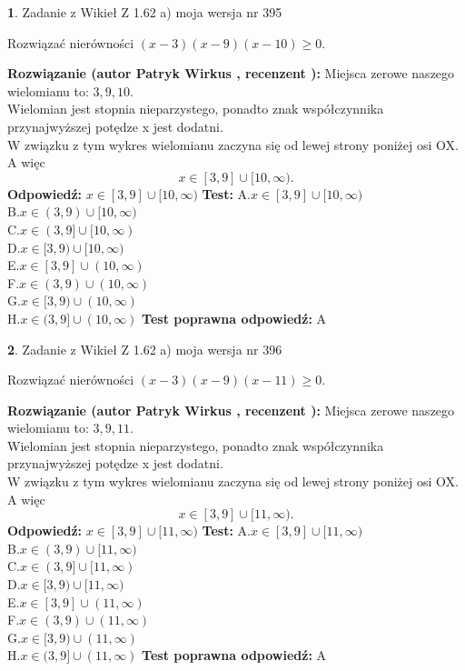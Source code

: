 \documentclass[12pt, a4paper]{article}
\theoremstyle{definition} %
\newtheorem{zad}{}
\newcommand{\zadStart}[1]{\begin{zad}#1\newline}
\newcommand{\zadStop}{\end{zad}}
\newcommand{\rozwStart}[2]{\noindent \textbf{Rozwiązanie (autor #1 , recenzent #2): }\newline}
\newcommand{\rozwStop}{\newline}
\newcommand{\odpStart}{\noindent \textbf{Odpowiedź:}\newline}
\newcommand{\odpStop}{\newline}
\newcommand{\testStart}{\noindent \textbf{Test:}\newline}
\newcommand{\testStop}{\newline}
\newcommand{\kluczStart}{\noindent \textbf{Test poprawna odpowiedź:}\newline}
\newcommand{\kluczStop}{\newline}
\begin{document}
\zadStart{Zadanie z Wikieł Z 1.62 a) moja wersja nr 395}

Rozwiązać nierówności $(x-3)(x-9)(x-10)\ge0$.
\zadStop
\rozwStart{Patryk Wirkus}{}
Miejsca zerowe naszego wielomianu to: $3, 9, 10$.\\
Wielomian jest stopnia nieparzystego, ponadto znak współczynnika przy\linebreak najwyższej potędze x jest dodatni.\\ W związku z tym wykres wielomianu zaczyna się od lewej strony poniżej osi OX. A więc $$x \in [3,9] \cup [10,\infty).$$
\rozwStop
\odpStart
$x \in [3,9] \cup [10,\infty)$
\odpStop
\testStart
A.$x \in [3,9] \cup [10,\infty)$\\
B.$x \in (3,9) \cup [10,\infty)$\\
C.$x \in (3,9] \cup [10,\infty)$\\
D.$x \in [3,9) \cup [10,\infty)$\\
E.$x \in [3,9] \cup (10,\infty)$\\
F.$x \in (3,9) \cup (10,\infty)$\\
G.$x \in [3,9) \cup (10,\infty)$\\
H.$x \in (3,9] \cup (10,\infty)$
\testStop
\kluczStart
A
\kluczStop



\zadStart{Zadanie z Wikieł Z 1.62 a) moja wersja nr 396}

Rozwiązać nierówności $(x-3)(x-9)(x-11)\ge0$.
\zadStop
\rozwStart{Patryk Wirkus}{}
Miejsca zerowe naszego wielomianu to: $3, 9, 11$.\\
Wielomian jest stopnia nieparzystego, ponadto znak współczynnika przy\linebreak najwyższej potędze x jest dodatni.\\ W związku z tym wykres wielomianu zaczyna się od lewej strony poniżej osi OX. A więc $$x \in [3,9] \cup [11,\infty).$$
\rozwStop
\odpStart
$x \in [3,9] \cup [11,\infty)$
\odpStop
\testStart
A.$x \in [3,9] \cup [11,\infty)$\\
B.$x \in (3,9) \cup [11,\infty)$\\
C.$x \in (3,9] \cup [11,\infty)$\\
D.$x \in [3,9) \cup [11,\infty)$\\
E.$x \in [3,9] \cup (11,\infty)$\\
F.$x \in (3,9) \cup (11,\infty)$\\
G.$x \in [3,9) \cup (11,\infty)$\\
H.$x \in (3,9] \cup (11,\infty)$
\testStop
\kluczStart
A
\kluczStop
\end{document}

